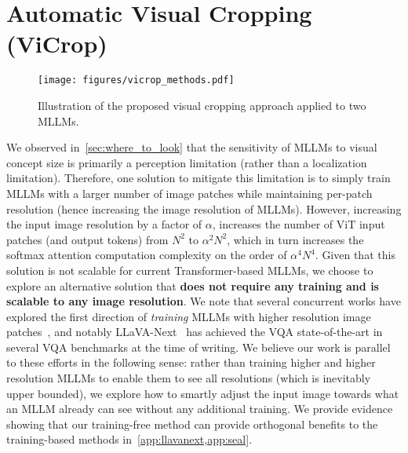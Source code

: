 \section{Automatic Visual Cropping (ViCrop)}
\label{sec:vicrop}

\begin{figure*}[b]
    \centering
    \texttt{[image: figures/vicrop\_methods.pdf]}
    \caption{Illustration of the proposed visual cropping approach applied to two MLLMs.}
    \label{fig:methods}
\end{figure*}

We observed in~\cref{sec:where_to_look} that the sensitivity of MLLMs to visual concept size is primarily a perception limitation (rather than a localization limitation). Therefore, one solution to mitigate this limitation is to simply train MLLMs with a larger number of image patches while maintaining per-patch resolution (hence increasing the image resolution of MLLMs). However, increasing the input image resolution by a factor of $\alpha$, increases the number of ViT input patches (and output tokens) from $N^2$ to $\alpha^2 N^2$, which in turn increases the softmax attention computation complexity on the order of $\alpha^4 N^4$. Given that this solution is not scalable for current Transformer-based MLLMs, we choose to explore an alternative solution that \textbf{does not require any training and is scalable to any image resolution}. We note that several concurrent works have explored the first direction of \textit{training} MLLMs with higher resolution image patches~\citep{li2024mini-gemini,sun2024parrot,li2024monkey,mckinzie2024mm1,xu2024llava-uhd,luo2024feast}, and notably LLaVA-Next~\citep{liu2024llavanext} has achieved the VQA state-of-the-art in several VQA benchmarks at the time of writing. We believe our work is parallel to these efforts in the following sense: rather than training higher and higher resolution MLLMs to enable them to see all resolutions (which is inevitably upper bounded), we explore how to smartly adjust the input image towards what an MLLM already can see without any additional training. We provide evidence showing that our training-free method can provide orthogonal benefits to the training-based methods in~\cref{app:llavanext,app:seal}.

